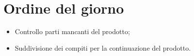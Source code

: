 \section{Ordine del giorno}
\begin{itemize}
\item Controllo parti mancanti del prodotto;
\item Suddivisione dei compiti per la continuazione del prodotto.
\end{itemize}